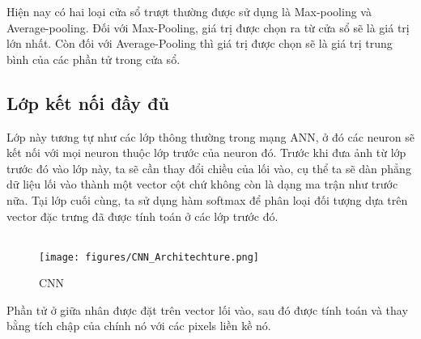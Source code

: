 Hiện nay có hai loại cửa sổ trượt thường được sử dụng là Max-pooling và Average-pooling. Đối với Max-Pooling, giá trị được chọn ra từ cửa sổ sẽ là giá trị lớn nhất. Còn đối với Average-Pooling thì giá trị được chọn sẽ là giá trị trung bình của các phần tử trong cửa sổ. 

\subsection{Lớp kết nối đầy đủ}
Lớp này tương tự như các lớp thông thường trong mạng ANN, ở đó các neuron sẽ kết nối với mọi neuron thuộc lớp trước của neuron đó. Trước khi đưa ảnh từ lớp trước đó vào lớp này, ta sẽ cần thay đổi chiều của lối vào, cụ thể ta sẽ dàn phẳng dữ liệu lối vào thành một vector cột chứ không còn là dạng ma trận như trước nữa. Tại lớp cuối cùng, ta sử dụng hàm softmax để phân loại đối tượng dựa trên vector đặc trưng đã được tính toán ở các lớp trước đó. 

\subsection{}
\begin{figure}[!h]
\center
\texttt{[image: figures/CNN\_Architechture.png]}
\caption{CNN}\label{fig:visual}
\end{figure}
Phần tử ở giữa nhân được đặt trên vector lối vào, sau đó được tính toán và thay bằng tích chập của chính nó với các pixels liền kề nó.


